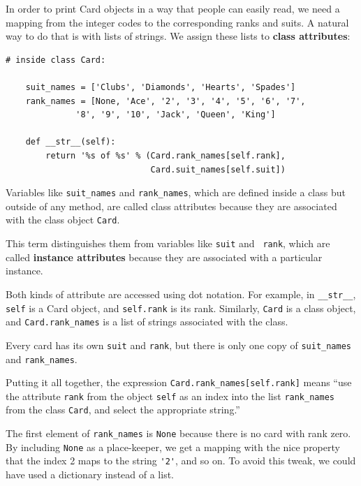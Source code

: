 \documentclass[10pt]{book}
\begin{document}
{

In order to print Card objects in a way that people can easily
read, we need a mapping from the integer codes to the corresponding
ranks and suits.  A natural way to
do that is with lists of strings.  We assign these lists to {\bf class
attributes}:

\beforeverb
\begin{verbatim}
# inside class Card:

    suit_names = ['Clubs', 'Diamonds', 'Hearts', 'Spades']
    rank_names = [None, 'Ace', '2', '3', '4', '5', '6', '7', 
              '8', '9', '10', 'Jack', 'Queen', 'King']

    def __str__(self):
        return '%s of %s' % (Card.rank_names[self.rank],
                             Card.suit_names[self.suit])
\end{verbatim}
\afterverb
%
Variables like \verb"suit_names" and \verb"rank_names", which are
defined inside a class but outside of any method, are called
class attributes because they are associated with the class object 
{\tt Card}.


This term distinguishes them from variables like {\tt suit} and {\tt
  rank}, which are called {\bf instance attributes} because they are
associated with a particular instance.


Both kinds of attribute are accessed using dot notation.  For
example, in \verb"__str__", {\tt self} is a Card object,
and {\tt self.rank} is its rank.  Similarly, {\tt Card}
is a class object, and \verb"Card.rank_names" is a
list of strings associated with the class.

Every card has its own {\tt suit} and {\tt rank}, but there
is only one copy of \verb"suit_names" and \verb"rank_names".

Putting it all together, the expression
\verb"Card.rank_names[self.rank]" means ``use the attribute {\tt rank}
from the object {\tt self} as an index into the list \verb"rank_names"
from the class {\tt Card}, and select the appropriate string.''

The first element of \verb"rank_names" is {\tt None} because there
is no card with rank zero.  By including {\tt None} as a place-keeper,
we get a mapping with the nice property that the index 2 maps to the
string \verb"'2'", and so on.  To avoid this tweak, we could have
used a dictionary instead of a list.

}
\end{document}
